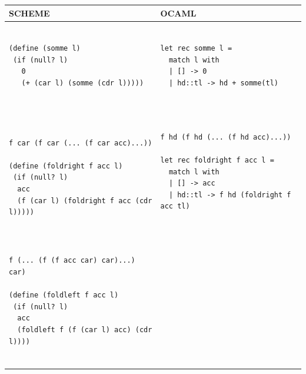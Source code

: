 \documentclass[11pt]{book}
\begin{document}
\begin{footnotesize}
\begin{tabular}{l|l} \hline
SCHEME & OCAML \\ \hline
\begin{minipage}{2.8in}
\begin{Verbatim}

(define (somme l)
 (if (null? l)
   0
   (+ (car l) (somme (cdr l)))))
   
\end{Verbatim}
\end{minipage}
&
\begin{minipage}{2.8in}
\begin{Verbatim}

let rec somme l =
  match l with
  | [] -> 0
  | hd::tl -> hd + somme(tl)  
  
\end{Verbatim} 
\end{minipage} \\ \hline
\begin{minipage}{2.8in}

\begin{Verbatim}

f car (f car (... (f car acc)...))

(define (foldright f acc l)
 (if (null? l)
  acc
  (f (car l) (foldright f acc (cdr l)))))
\end{Verbatim}
\end{minipage}
&
\begin{minipage}{2.8in}

\begin{Verbatim}

f hd (f hd (... (f hd acc)...))

let rec foldright f acc l =
  match l with
  | [] -> acc
  | hd::tl -> f hd (foldright f acc tl)
  
\end{Verbatim}
\end{minipage} \\ \hline
\begin{minipage}{2.8in}
\begin{Verbatim}

f (... (f (f acc car) car)...) car)

(define (foldleft f acc l)
 (if (null? l)
  acc
  (foldleft f (f (car l) acc) (cdr l))))
  
\end{Verbatim}
\end{minipage}
&
\begin{minipage}{2.8in}
\begin{Verbatim}


\end{Verbatim}
\end{minipage}
\end{tabular}
\end{footnotesize}
\end{document}
